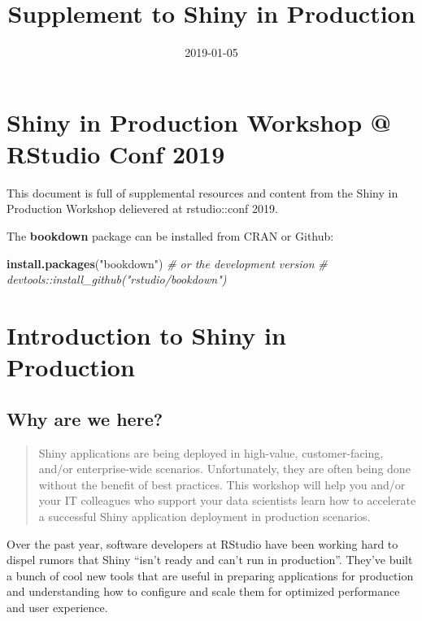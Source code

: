 \documentclass[]{book}
\title{Supplement to Shiny in Production}
\author{}
\date{2019-01-05}
\newenvironment{Shaded}{\begin{snugshade}}{\end{snugshade}}
\newcommand{\CommentTok}[1]{\textcolor[rgb]{0.56,0.35,0.01}{\textit{#1}}}
\newcommand{\KeywordTok}[1]{\textcolor[rgb]{0.13,0.29,0.53}{\textbf{#1}}}
\newcommand{\NormalTok}[1]{#1}
\newcommand{\StringTok}[1]{\textcolor[rgb]{0.31,0.60,0.02}{#1}}
\begin{document}
\maketitle

{
\setcounter{tocdepth}{1}
\tableofcontents
}
\hypertarget{shiny-in-production-workshop-rstudio-conf-2019}{%
\chapter{Shiny in Production Workshop @ RStudio Conf
2019}\label{shiny-in-production-workshop-rstudio-conf-2019}}

This document is full of supplemental resources and content from the
Shiny in Production Workshop delievered at rstudio::conf 2019.

The \textbf{bookdown} package can be installed from CRAN or Github:

\begin{Shaded}
\begin{Highlighting}[]
\KeywordTok{install.packages}\NormalTok{(}\StringTok{"bookdown"}\NormalTok{)}
\CommentTok{# or the development version}
\CommentTok{# devtools::install_github("rstudio/bookdown")}
\end{Highlighting}
\end{Shaded}

\hypertarget{course-intro}{%
\chapter{Introduction to Shiny in Production}\label{course-intro}}

\hypertarget{why-are-we-here}{%
\section{Why are we here?}\label{why-are-we-here}}

\begin{quote}
Shiny applications are being deployed in high-value, customer-facing,
and/or enterprise-wide scenarios. Unfortunately, they are often being
done without the benefit of best practices. This workshop will help you
and/or your IT colleagues who support your data scientists learn how to
accelerate a successful Shiny application deployment in production
scenarios.
\end{quote}

Over the past year, software developers at RStudio have been working
hard to dispel rumors that Shiny ``isn't ready and can't run in
production''. They've built a bunch of cool new tools that are useful in
preparing applications for production and understanding how to configure
and scale them for optimized performance and user experience.
\end{document}
